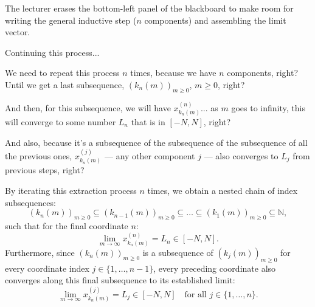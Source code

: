 \begin{proofWrapper}
\begin{note}
The lecturer erases the bottom-left panel of the blackboard to make room for writing the general inductive step ($n$ components) and assembling the limit vector.
\end{note}

\begin{speech}[01:03:34 - 01:05:21]
Continuing this process... 

We need to repeat this process $n$ times, because we have $n$ components, right? Until we get a last subsequence, $(k_n(m))_{m \ge 0}$,  $m \ge 0$, right?

And then, for this subsequence, we will have $x_{k_n(m)}^{(n)}$...  as $m$ goes to infinity, this will converge to some number $L_n$  that is in $[-N, N]$, right? 

And also, because it's a subsequence of the subsequence of the subsequence of all the previous ones, $x_{k_n(m)}^{(j)}$ --- any other component $j$ --- also converges to $L_j$  from previous steps, right? 
\end{speech}

\begin{content}
By iterating this extraction process $n$ times, we obtain a nested chain of index subsequences:
\[
(k_n(m))_{m \ge 0} \subseteq (k_{n-1}(m))_{m \ge 0} \subseteq \dots \subseteq (k_1(m))_{m \ge 0} \subseteq \mathbb{N},
\]
such that for the final coordinate $n$:
\begin{equation}\label{eq:nth-component-limit}
\lim_{m \to \infty} x_{k_n(m)}^{(n)} = L_n \in [-N, N].
\end{equation}
Furthermore, since $(k_n(m))_{m \ge 0}$ is a subsequence of $(k_j(m))_{m \ge 0}$ for every coordinate index $j \in \{1, \dots, n-1\}$, every preceding coordinate also converges along this final subsequence to its established limit:
\begin{equation}\label{eq:all-j-components-limit}
\lim_{m \to \infty} x_{k_n(m)}^{(j)} = L_j \in [-N, N] \quad \text{for all } j \in \{1, \dots, n\}.
\end{equation}
\end{content}


\end{proofWrapper}
